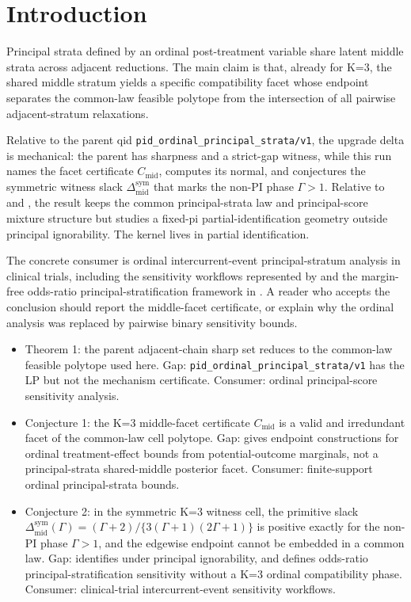 \documentclass[11pt]{article}
\theoremstyle{definition}
\theoremstyle{plain}
\theoremstyle{remark}
\begin{document}
\section{Introduction}
Principal strata defined by an ordinal post-treatment variable share latent middle strata across adjacent reductions.  The main claim is that, already for K=3, the shared middle stratum yields a specific compatibility facet whose endpoint separates the common-law feasible polytope from the intersection of all pairwise adjacent-stratum relaxations.

Relative to the parent qid \texttt{pid\_ordinal\_principal\_strata/v1}, the upgrade delta is mechanical: the parent has sharpness and a strict-gap witness, while this run names the facet certificate \(C_{\mathrm{mid}}\), computes its normal, and conjectures the symmetric witness slack \(\Delta_{\mathrm{mid}}^{\mathrm{sym}}\) that marks the non-PI phase \(\Gamma>1\).  Relative to \citet[p.~21]{FrangakisRubin2002} and \citet[Section~2]{DingLu2017}, the result keeps the common principal-strata law and principal-score mixture structure but studies a fixed-pi partial-identification geometry outside principal ignorability.  The kernel lives in partial identification.

The concrete consumer is ordinal intercurrent-event principal-stratum analysis in clinical trials, including the sensitivity workflows represented by \citet{WangZhangMealliBornkamp2023} and the margin-free odds-ratio principal-stratification framework in \citet{TongKahanHarhayLi2025}.  A reader who accepts the conclusion should report the middle-facet certificate, or explain why the ordinal analysis was replaced by pairwise binary sensitivity bounds.

\begin{itemize}[leftmargin=*]
\item Theorem 1: the parent adjacent-chain sharp set reduces to the common-law feasible polytope used here. Gap: \texttt{pid\_ordinal\_principal\_strata/v1} has the LP but not the mechanism certificate. Consumer: ordinal principal-score sensitivity analysis.
\item Conjecture 1: the K=3 middle-facet certificate \(C_{\mathrm{mid}}\) is a valid and irredundant facet of the common-law cell polytope. Gap: \citet[Section~2, Theorem~1]{LuZhangDing2020} gives endpoint constructions for ordinal treatment-effect bounds from potential-outcome marginals, not a principal-strata shared-middle posterior facet. Consumer: finite-support ordinal principal-strata bounds.
\item Conjecture 2: in the symmetric K=3 witness cell, the primitive slack \(\Delta_{\mathrm{mid}}^{\mathrm{sym}}(\Gamma)=(\Gamma+2)/\{3(\Gamma+1)(2\Gamma+1)\}\) is positive exactly for the non-PI phase \(\Gamma>1\), and the edgewise endpoint cannot be embedded in a common law. Gap: \citet[Section~3.2]{DingLu2017} identifies under principal ignorability, and \citet[Sections~2 and 5]{TongKahanHarhayLi2025} defines odds-ratio principal-stratification sensitivity without a K=3 ordinal compatibility phase. Consumer: clinical-trial intercurrent-event sensitivity workflows.
\end{itemize}
\end{document}
